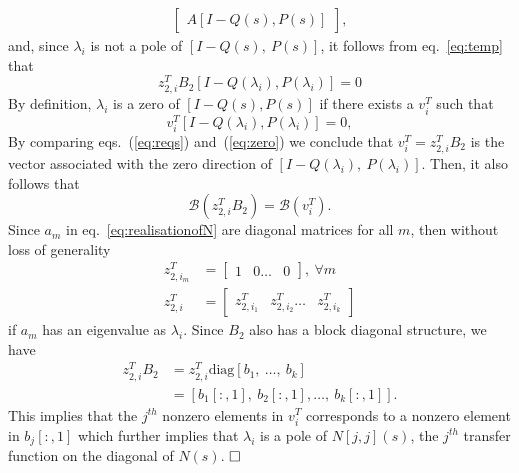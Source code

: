 \documentclass[twocolumn,12pt]{autart}
\theoremstyle{plain}
\newenvironment{proof}[1][Proof]{\begin{trivlist} \item[\hskip \labelsep {\bfseries #1}]}{\end{trivlist}}
\begin{document}
\begin{proof}
\begin{align*}
\begin{bmatrix} {A}
{[I-Q(s),P(s)]}
\end{bmatrix},
\end{align*}
and, since $\lambda_i$ is not a pole of $[I-Q(s),~P(s)]$, it follows from eq.~\eqref{eq:temp} that
\begin{equation}\label{eq:reqs}
{z}^T_{2,i}B_2{[I-Q(\lambda_i),P(\lambda_i)]}=0
\end{equation}
By definition, $\lambda_i$ is a zero of ${[I-Q(s),P(s)]}$ if
there exists a $v_i^T$ such that 
\begin{equation}\label{eq:zero}
v_i^T{[I-Q(\lambda_i),P(\lambda_i)]}=0,
\end{equation}
By comparing eqs.~(\ref{eq:reqs}) and~(\ref{eq:zero}) we conclude that $v_i^T={z}^T_{2,i}B_2$ is the vector associated with the zero direction of ${[I-Q(\lambda_i),~P(\lambda_i)]}$. 
Then, it also follows that  
\begin{equation}\label{eq:vector}
\mathcal{B}({z}^T_{2,i}B_2)=\mathcal{B}(v_i^T).
\end{equation}
Since $a_m$ in eq.~\eqref{eq:realisationofN} are diagonal matrices for all $m$, then without loss of generality 
\begin{align*}
z^T_{2,i_m}&=\begin{bmatrix}1&0\ldots &0\end{bmatrix},~\forall m\\
z^T_{2,i}&=\begin{bmatrix}z^T_{2,i_1}&z^T_{2,i_2}\ldots &z^T_{2,i_k}\end{bmatrix}
\end{align*}
if $a_m$ has an eigenvalue as $\lambda_i$. 
Since $B_2$ also has a block diagonal structure,  we have 
\begin{align*}
{z}^T_{2,i}B_2&={z}^T_{2,i}\text{diag} [b_1,~\ldots,~b_k]\\
&=\left[b_1[:,1],~b_2[:,1], \ldots,~ b_k[:,1]\right].
\end{align*}
This implies that the $j^{th}$ nonzero elements in $v_i^T$ corresponds to a nonzero element in $b_j[:,1]$ which further implies that $\lambda_i$ is a pole of $N[j,j](s)$, the $j^{th}$ transfer function on the diagonal of $N(s)$. $\hfill \square$
\end{proof}
\end{document}
